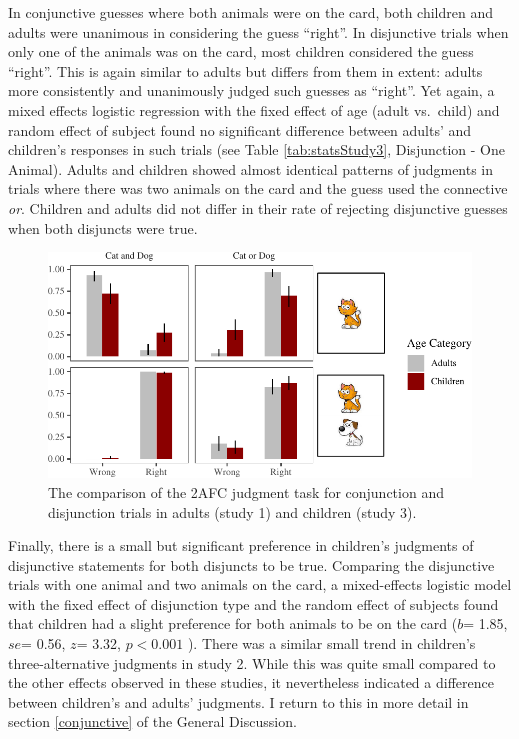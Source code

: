 \documentclass[man]{apa6}
\theoremstyle{definition}
\theoremstyle{definition}
\theoremstyle{definition}
\theoremstyle{remark}
\begin{document}
In conjunctive guesses where both animals were on the card, both
children and adults were unanimous in considering the guess
\enquote{right}. In disjunctive trials when only one of the animals was
on the card, most children considered the guess \enquote{right}. This is
again similar to adults but differs from them in extent: adults more
consistently and unanimously judged such guesses as \enquote{right}. Yet
again, a mixed effects logistic regression with the fixed effect of age
(adult vs.~child) and random effect of subject found no significant
difference between adults' and children's responses in such trials (see
Table \ref{tab:statsStudy3}, Disjunction - One Animal). Adults and
children showed almost identical patterns of judgments in trials where
there was two animals on the card and the guess used the connective
\emph{or}. Children and adults did not differ in their rate of rejecting
disjunctive guesses when both disjuncts were true.

\begin{figure}[t]

{\centering \includegraphics{figs/BinaryPlotComp-1} 

}

\caption{The comparison of the 2AFC judgment task for conjunction and disjunction trials in adults (study 1) and children (study 3).}\label{fig:BinaryPlotComp}
\end{figure}

Finally, there is a small but significant preference in children's
judgments of disjunctive statements for both disjuncts to be true.
Comparing the disjunctive trials with one animal and two animals on the
card, a mixed-effects logistic model with the fixed effect of
disjunction type and the random effect of subjects found that children
had a slight preference for both animals to be on the card (\(b\)= 1.85,
\(se\)= 0.56, \(z\)= 3.32, \(p < 0.001\) ). There was a similar small
trend in children's three-alternative judgments in study 2. While this
was quite small compared to the other effects observed in these studies,
it nevertheless indicated a difference between children's and adults'
judgments. I return to this in more detail in section \ref{conjunctive}
of the General Discussion.
\end{document}

